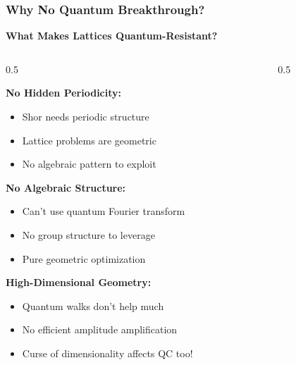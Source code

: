 \documentclass[aspectratio=169,10pt]{beamer}
\newcommand{\slideheader}[1]{\frametitle{#1}}
\theoremstyle{plain}
\begin{document}
\begin{frame}
  \slideheader{Why No Quantum Breakthrough?}
  
  \begin{center}
    \textbf{\large What Makes Lattices Quantum-Resistant?}
  \end{center}
  
  \vspace{0.5cm}
  
  \begin{columns}[T]
    \begin{column}{0.5\textwidth}

    \textbf{No Hidden Periodicity:}
    \begin{itemize}
      \item Shor needs periodic structure
      \item Lattice problems are geometric
      \item No algebraic pattern to exploit
    \end{itemize}
    
    \vspace{0.3cm}
    
    \textbf{No Algebraic Structure:}
    \begin{itemize}
      \item Can't use quantum Fourier transform
      \item No group structure to leverage
      \item Pure geometric optimization
    \end{itemize}
    
    \vspace{0.3cm}
    
    \textbf{High-Dimensional Geometry:}
    \begin{itemize}
      \item Quantum walks don't help much
      \item No efficient amplitude amplification
      \item Curse of dimensionality affects QC too!
    \end{itemize}
  
    \end{column}
    \begin{column}{0.5\textwidth}

\end{column}
\end{columns}
\end{frame}
\end{document}
